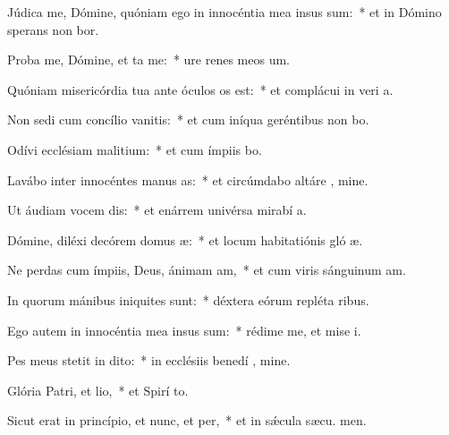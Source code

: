 \item Júdica me, Dómine, quóniam ego in innocéntia mea insus sum:~* et in Dómino sperans non bor.
\item Proba me, Dómine, et ta me:~* ure renes meos   um.
\item Quóniam misericórdia tua ante óculos os est:~* et complácui in veri a.
\item Non sedi cum concílio vanitis:~* et cum iníqua geréntibus non bo.
\item Odívi ecclésiam malitium:~* et cum ímpiis  bo.
\item Lavábo inter innocéntes manus as:~* et circúmdabo altáre , mine.
\item Ut áudiam vocem dis:~* et enárrem univérsa mirabí a.
\item Dómine, diléxi decórem domus æ:~* et locum habitatiónis gló æ.
\item Ne perdas cum ímpiis, Deus, ánimam am,~* et cum viris sánguinum  am.
\item In quorum mánibus iniquites sunt:~* déxtera eórum repléta  ribus.
\item Ego autem in innocéntia mea insus sum:~* rédime me, et mise i.
\item Pes meus stetit in dito:~* in ecclésiis benedí , mine.
\item Glória Patri, et lio,~* et Spirí to.
\item Sicut erat in princípio, et nunc, et per,~* et in sǽcula sæcu. men.
